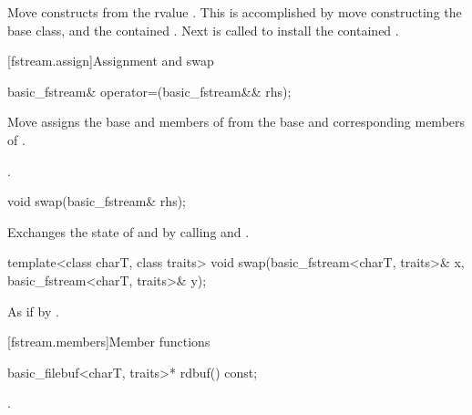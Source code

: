 \begin{itemdescr}
\pnum
\effects Move constructs from the rvalue . This
is accomplished by move constructing the base class, and the contained
. Next
is called to install
the contained .
\end{itemdescr}

[fstream.assign]{Assignment and swap}

%
\begin{itemdecl}
basic_fstream& operator=(basic_fstream&& rhs);
\end{itemdecl}

\begin{itemdescr}
\pnum
\effects Move assigns the base and members of  from the base and corresponding
members of .

\pnum
\returns {}.
\end{itemdescr}

%
\begin{itemdecl}
void swap(basic_fstream& rhs);
\end{itemdecl}

\begin{itemdescr}
\pnum
\effects Exchanges the state of 
and  by calling
 and
.
\end{itemdescr}

%
\begin{itemdecl}
template<class charT, class traits>
  void swap(basic_fstream<charT, traits>& x,
            basic_fstream<charT, traits>& y);
\end{itemdecl}

\begin{itemdescr}
\pnum
\effects As if by .
\end{itemdescr}

[fstream.members]{Member functions}

%
\begin{itemdecl}
basic_filebuf<charT, traits>* rdbuf() const;
\end{itemdecl}

\begin{itemdescr}
\pnum
\returns
{}.
\end{itemdescr}

